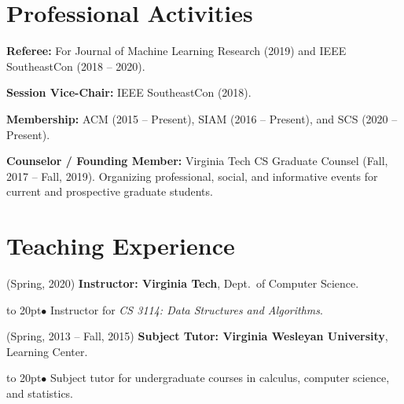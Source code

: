 \documentclass[11pt]{article}
\def\bullitem{\par\hangindent=15pt \hangafter=1
\noindent\hbox to 20pt{\hfil$\bullet$\hfil}\ignorespaces}
\begin{document}

\section*{Professional Activities}

\textbf{Referee:} For
Journal of Machine Learning Research (2019) and
IEEE SoutheastCon (2018 -- 2020).

\textbf{Session Vice-Chair:} IEEE SoutheastCon (2018).

\textbf{Membership:} ACM (2015 -- Present), SIAM (2016 -- Present), and
SCS (2020 -- Present).

\textbf{Counselor / Founding Member:} Virginia Tech CS Graduate Counsel 
(Fall, 2017 -- Fall, 2019).
Organizing professional, social, and informative events for
current and prospective graduate students.

\section*{Teaching Experience}

(Spring, 2020)
\textbf{Instructor: Virginia Tech}, Dept.\ of Computer Science.
\bullitem
Instructor for {\it CS 3114: Data Structures and Algorithms}.

\medskip

(Spring, 2013 -- Fall, 2015)
\textbf{Subject Tutor: Virginia Wesleyan University}, Learning Center.
\bullitem
Subject tutor for undergraduate courses in calculus, computer science, and
statistics.
\end{document}
